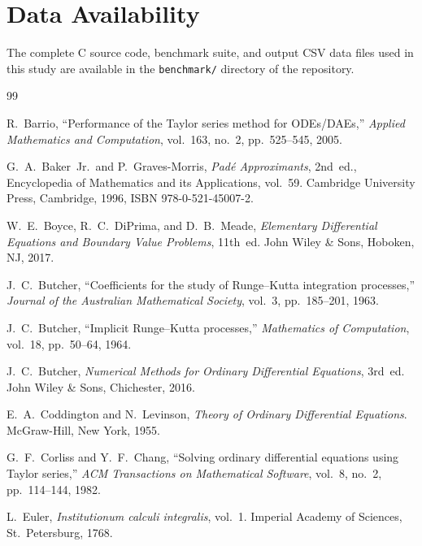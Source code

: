 \documentclass[12pt,a4paper]{article}
\theoremstyle{definition}
\theoremstyle{remark}
\begin{document}
\section*{Data Availability}

The complete C source code, benchmark suite, and output CSV data files used in this study are available in the \texttt{benchmark/} directory of the repository.

\begin{thebibliography}{99}

R.~Barrio,
``Performance of the {T}aylor series method for {ODE}s/{DAE}s,''
\textit{Applied Mathematics and Computation},
vol.~163, no.~2, pp.~525--545, 2005.

G.~A.~Baker~Jr.\ and P.~Graves-Morris,
\textit{Padé Approximants}, 2nd~ed.,
Encyclopedia of Mathematics and its Applications, vol.~59.
Cambridge University Press, Cambridge, 1996,
ISBN 978-0-521-45007-2.

W.~E.~Boyce, R.~C.~DiPrima, and D.~B.~Meade,
\textit{Elementary Differential Equations and Boundary
Value Problems}, 11th~ed.
John Wiley \& Sons, Hoboken, NJ, 2017.

J.~C.~Butcher,
``Coefficients for the study of {R}unge--{K}utta integration
processes,''
\textit{Journal of the Australian Mathematical Society},
vol.~3, pp.~185--201, 1963.

J.~C.~Butcher,
``Implicit {R}unge--{K}utta processes,''
\textit{Mathematics of Computation},
vol.~18, pp.~50--64, 1964.

J.~C.~Butcher,
\textit{Numerical Methods for Ordinary Differential
Equations}, 3rd~ed.
John Wiley \& Sons, Chichester, 2016.

E.~A.~Coddington and N.~Levinson,
\textit{Theory of Ordinary Differential Equations}.
McGraw-Hill, New York, 1955.

G.~F.~Corliss and Y.~F.~Chang,
``Solving ordinary differential equations using {T}aylor series,''
\textit{ACM Transactions on Mathematical Software},
vol.~8, no.~2, pp.~114--144, 1982.

L.~Euler,
\textit{Institutionum calculi integralis}, vol.~1.
Imperial Academy of Sciences, St.~Petersburg, 1768.


\end{thebibliography}
\end{document}

